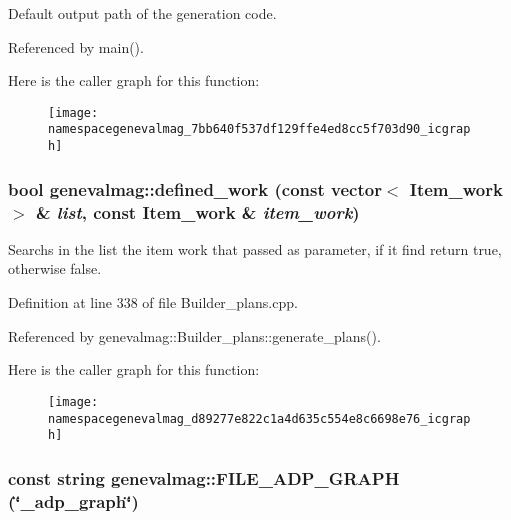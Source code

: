 Default output path of the generation code. 

Referenced by main().

Here is the caller graph for this function:\nopagebreak
\begin{figure}[H]
\begin{center}
\leavevmode
\texttt{[image: namespacegenevalmag\_7bb640f537df129ffe4ed8cc5f703d90\_icgraph]}
\end{center}
\end{figure}
\hypertarget{namespacegenevalmag_d89277e822c1a4d635c554e8c6698e76}{
\subsubsection[{defined\_\-work}]{\setlength{\rightskip}{0pt plus 5cm}bool genevalmag::defined\_\-work (const vector$<$ {\bf Item\_\-work} $>$ \& {\em list}, \/  const {\bf Item\_\-work} \& {\em item\_\-work})}}
\label{namespacegenevalmag_d89277e822c1a4d635c554e8c6698e76}


Searchs in the list the item work that passed as parameter, if it find return true, otherwise false. 

Definition at line 338 of file Builder\_\-plans.cpp.

Referenced by genevalmag::Builder\_\-plans::generate\_\-plans().

Here is the caller graph for this function:\nopagebreak
\begin{figure}[H]
\begin{center}
\leavevmode
\texttt{[image: namespacegenevalmag\_d89277e822c1a4d635c554e8c6698e76\_icgraph]}
\end{center}
\end{figure}
\hypertarget{namespacegenevalmag_c89f8e579ae12e809a074364a2aced0c}{
\subsubsection[{FILE\_\-ADP\_\-GRAPH}]{\setlength{\rightskip}{0pt plus 5cm}const string genevalmag::FILE\_\-ADP\_\-GRAPH (\char`\"{}\_\-adp\_\-graph\char`\"{})}}
\label{namespacegenevalmag_c89f8e579ae12e809a074364a2aced0c}




